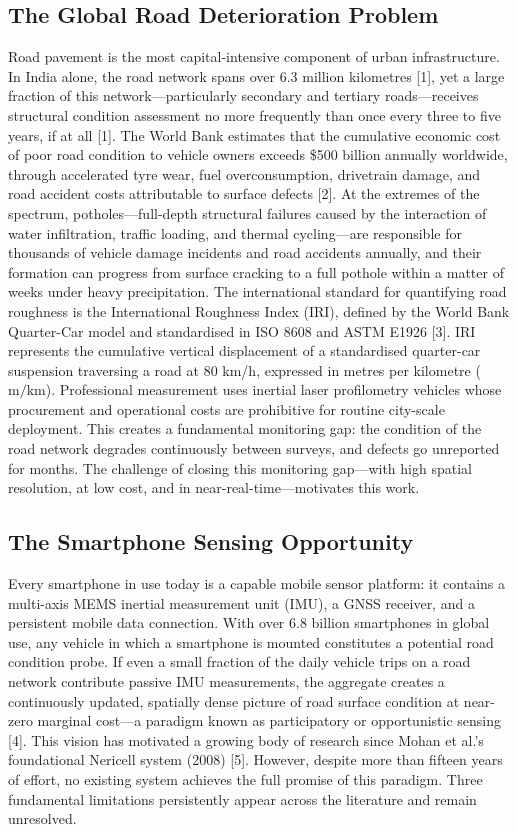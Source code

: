 \documentclass[conference]{IEEEtran}
\begin{document}
\subsection{The Global Road Deterioration Problem}
Road pavement is the most capital-intensive component of urban infrastructure.
In India alone, the road network spans over 6.3 million kilometres [1], yet a large fraction of this network---particularly secondary and tertiary roads---receives structural condition assessment no more frequently than once every three to five years, if at all [1].
The World Bank estimates that the cumulative economic cost of poor road condition to vehicle owners exceeds \$500 billion annually worldwide, through accelerated tyre wear, fuel overconsumption, drivetrain damage, and road accident costs attributable to surface defects [2].
At the extremes of the spectrum, potholes---full-depth structural failures caused by the interaction of water infiltration, traffic loading, and thermal cycling---are responsible for thousands of vehicle damage incidents and road accidents annually, and their formation can progress from surface cracking to a full pothole within a matter of weeks under heavy precipitation.
The international standard for quantifying road roughness is the International Roughness Index (IRI), defined by the World Bank Quarter-Car model and standardised in ISO 8608 and ASTM E1926 [3].
IRI represents the cumulative vertical displacement of a standardised quarter-car suspension traversing a road at 80 km/h, expressed in metres per kilometre ($\text{m/km}$).
Professional measurement uses inertial laser profilometry vehicles whose procurement and operational costs are prohibitive for routine city-scale deployment.
This creates a fundamental monitoring gap: the condition of the road network degrades continuously between surveys, and defects go unreported for months.
The challenge of closing this monitoring gap---with high spatial resolution, at low cost, and in near-real-time---motivates this work.

\subsection{The Smartphone Sensing Opportunity}
Every smartphone in use today is a capable mobile sensor platform: it contains a multi-axis MEMS inertial measurement unit (IMU), a GNSS receiver, and a persistent mobile data connection.
With over 6.8 billion smartphones in global use, any vehicle in which a smartphone is mounted constitutes a potential road condition probe.
If even a small fraction of the daily vehicle trips on a road network contribute passive IMU measurements, the aggregate creates a continuously updated, spatially dense picture of road surface condition at near-zero marginal cost---a paradigm known as participatory or opportunistic sensing [4].
This vision has motivated a growing body of research since Mohan et al.'s foundational Nericell system (2008) [5].
However, despite more than fifteen years of effort, no existing system achieves the full promise of this paradigm.
Three fundamental limitations persistently appear across the literature and remain unresolved.
\end{document}
